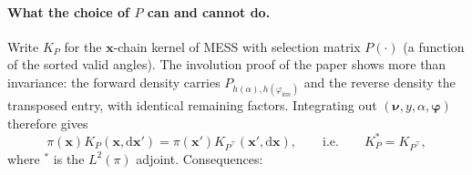 \documentclass[11pt,a4paper]{article}
\theoremstyle{remark}
\newcommand{\bx}{\bm{x}}
\newcommand{\bnu}{\bm{\nu}}
\begin{document}
\paragraph{What the choice of $P$ can and cannot do.}
Write $K_P$ for the $\bx$-chain kernel of MESS with selection matrix $P(\cdot)$ (a function of the sorted valid angles). The involution proof of the paper shows more than invariance: the forward density carries $P_{h(\alpha),h(\varphi_{km})}$ and the reverse density the transposed entry, with identical remaining factors. Integrating out $(\bnu,y,\alpha,\bm\varphi)$ therefore gives
\begin{equation}\label{eq:adjoint}
\pi(\bx)K_P(\bx,\mathrm d\bx')=\pi(\bx')K_{P^\top}(\bx',\mathrm d\bx),\qquad\text{i.e.}\qquad K_P^{*}=K_{P^\top},
\end{equation}
where $^{*}$ is the $L^2(\pi)$ adjoint. Consequences:
\end{document}
